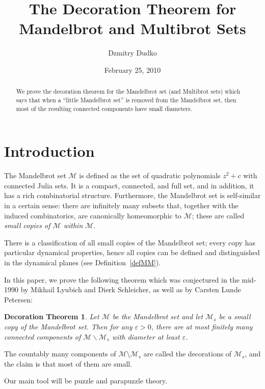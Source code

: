 \documentclass[12pt,a4paper]{amsart}
\newtheorem*{decotheorem}{Decoration Theorem}
\newcommand{\MM}{\mathcal M}
\newcommand{\eps}{\varepsilon}
\newcommand{\sm}{\setminus}
\begin{document}
\title[The Decoration Theorem]{The Decoration Theorem for Mandelbrot and Multibrot Sets \\ }
\author{Dzmitry Dudko}
\date{February 25, 2010}
\maketitle

\begin{abstract}
We prove the decoration theorem for the Mandelbrot set (and Multibrot sets) which says that
 when a ``little Mandelbrot set'' is removed from the Mandelbrot set, then most of the
  resulting connected components have small diameters.
\end{abstract}

\section{Introduction}
 The Mandelbrot set $\MM$ is defined as the set of
quadratic polynomials $z^2+c$  with connected Julia sets. It is a
compact, connected, and full set, and in addition, it has a rich
combinatorial structure. Furthermore, the Mandelbrot set is
self-similar in a certain sense: there are infinitely many subsets
that, together with the induced combinatorics, are canonically
homeomorphic to $\MM$; these are called \emph{small copies of $\MM$
within $\MM$}.

There is a classification of all small copies of the Mandelbrot set;
every copy has particular dynamical properties, hence all copies can
be defined and distinguished in the dynamical planes (see
Definition~\ref*{defMM}).

   In this paper, we prove the following theorem which was conjectured in the
mid-1990 by Mikhail Lyubich and Dierk Schleicher, as well as by
Carsten Lunde Petersen:

\begin{decotheorem}
\label{MainConj} Let $\MM$ be the Mandelbrot set and let $\MM_{s}$
be a small copy of the Mandelbrot set. Then for any $\varepsilon >
0$, there are at most finitely many connected components of $\MM
\backslash \MM_{s}$ with diameter at least $\eps$.
\end{decotheorem}
The countably many components of $\MM\sm\MM_s$ are called the
decorations of $\MM_s$, and the claim is that most of them are
small.

Our main tool will be puzzle and parapuzzle theory.

\medskip
\end{document}
